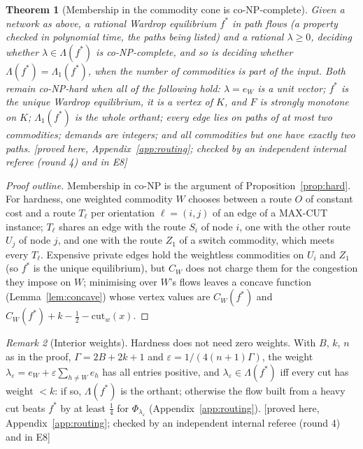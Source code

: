 \documentclass[11pt,a4paper]{article}
\theoremstyle{plain}
\newtheorem{theorem}{Theorem}[section]
\theoremstyle{definition}
\theoremstyle{remark}
\newtheorem{remark}[theorem]{Remark}
\newcommand{\status}[1]{\textsf{\small [#1]}}
\newcommand{\Lam}{\Lambda}
\newcommand{\Lone}{\Lambda_{1}}
\begin{document}
\begin{theorem}[Membership in the commodity cone is co-NP-complete]\label{thm:routinghard}
Given a network as above, a rational Wardrop equilibrium $f^*$ in path flows (a property checked in polynomial time, the paths being listed) and a rational $\lambda\ge0$, deciding whether $\lambda\in\Lam(f^*)$ is co-NP-complete, and so is deciding whether $\Lam(f^*)=\Lone(f^*)$, when the number of commodities is part of the input. Both remain co-NP-hard when all of the following hold: $\lambda=e_W$ is a unit vector; $f^*$ is the unique Wardrop equilibrium, it is a vertex of $K$, and $F$ is strongly monotone on $K$; $\Lone(f^*)$ is the whole orthant; every edge lies on paths of at most two commodities; demands are integers; and all commodities but one have exactly two paths. \status{proved here, Appendix~\ref{app:routing}; checked by an independent internal referee (round 4) and in E8}
\end{theorem}
\begin{proof}[Proof outline]
Membership in co-NP is the argument of Proposition~\ref{prop:hard}. For hardness, one weighted commodity $W$ chooses between a route $O$ of constant cost and a route $T_\ell$ per orientation $\ell=(i,j)$ of an edge of a MAX-CUT instance; $T_\ell$ shares an edge with the route $S_i$ of node $i$, one with the other route $U_j$ of node $j$, and one with the route $Z_1$ of a switch commodity, which meets every $T_\ell$. Expensive private edges hold the weightless commodities on $U_i$ and $Z_1$ (so $f^*$ is the unique equilibrium), but $C_W$ does not charge them for the congestion they impose on $W$; minimising over $W$'s flows leaves a concave function (Lemma~\ref{lem:concave}) whose vertex values are $C_W(f^*)$ and $C_W(f^*)+k-\tfrac12-\mathrm{cut}_w(x)$.
\end{proof}

\begin{remark}[Interior weights]\label{rem:interior}
Hardness does not need zero weights. With $B$, $k$, $n$ as in the proof, $\Gamma=2B+2k+1$ and $\varepsilon=1/(4(n+1)\Gamma)$, the weight $\lambda_\varepsilon=e_W+\varepsilon\sum_{h\ne W}e_h$ has all entries positive, and $\lambda_\varepsilon\in\Lam(f^*)$ iff every cut has weight $<k$: if so, $\Lam(f^*)$ is the orthant; otherwise the flow built from a heavy cut beats $f^*$ by at least $\tfrac14$ for $\Phi_{\lambda_\varepsilon}$ (Appendix~\ref{app:routing}). \status{proved here, Appendix~\ref{app:routing}; checked by an independent internal referee (round 4) and in E8}
\end{remark}
\end{document}

